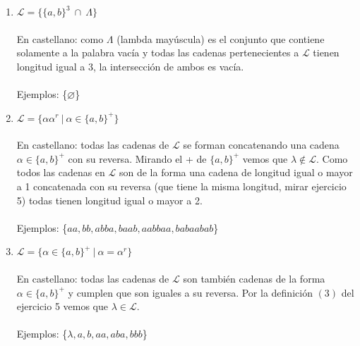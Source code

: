 \documentclass{article}
\begin{document}
{{\begin{enumerate}[label=\alph*.,font=\itshape]
{{    \\
    \\
    Ejemplos: \{$acbabbabbab, acacbabbabbabbab, aacbabbabbab$\}}}
    \item {$\mathcal{L} = \{\{ a, b \}^3 \ \cap \ \Lambda\}$
    \\
    \\
    {En castellano: como $\Lambda$ (lambda mayúscula) es el conjunto que contiene solamente a la palabra vacía y todas las cadenas pertenecientes a $\mathcal{L}$ tienen longitud igual a 3, la intersección de ambos es vacía.}
    \\
    \\
    Ejemplos: \{$\varnothing$\}}
    \item {$\mathcal{L} = \{ \alpha\alpha^r \ | \ \alpha \in \{ a,b \} ^+ \} $
    \\
    \\
    {En castellano: todas las cadenas de $\mathcal{L}$ se forman concatenando una cadena $\alpha \in \{a,b\}^+$ con su reversa. Mirando el + de $\{a,b\}^+$ vemos que $\lambda \notin \mathcal{L}$. Como todos las cadenas en $\mathcal{L}$ son de la forma una cadena de longitud igual o mayor a 1 concatenada con su reversa (que tiene la misma longitud, mirar ejercicio 5) todas tienen longitud igual o mayor a 2.}
    \\
    \\
    Ejemplos: \{$aa, bb, abba, baab, aabbaa, babaabab$\}}
    \item {$\mathcal{L} = \{ \alpha \in \{ a,b \} ^+ \ | \ \alpha = \alpha^r \} $
    \\
    \\
    {En castellano: todas las cadenas de $\mathcal{L}$ son también cadenas de la forma $\alpha \in \{a,b\}^+$ y cumplen que son iguales a su reversa. Por la definición $(3)$ del ejercicio 5 vemos que $\lambda \in \mathcal{L}$.}
    \\
    \\
    Ejemplos: \{$\lambda, a, b, aa, aba, bbb$\}}
\end{enumerate}

}}
\end{document}
